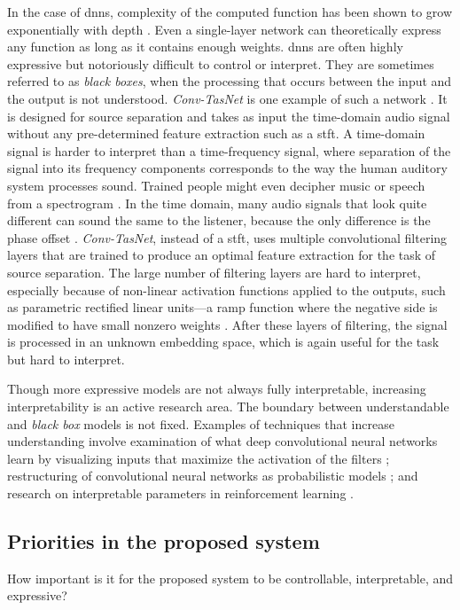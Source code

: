 In the case of \gls{dnn}s, complexity of the computed function has been shown to grow exponentially with depth \cite{raghu2017expressive}. Even a single-layer network can theoretically express any function as long as it contains enough weights. \gls{dnn}s are often highly expressive but notoriously difficult to control or interpret. They are sometimes referred to as \textit{black boxes}, when the processing that occurs between the input and the output is not understood. \textit{Conv-TasNet} is one example of such a network \cite{luo2019conv}. It is designed for source separation and takes as input the time-domain audio signal without any pre-determined feature extraction such as a \gls{stft}. A time-domain signal is harder to interpret than a time-frequency signal, where separation of the signal into its frequency  components corresponds to the way the human auditory system processes sound. Trained people might even decipher music or speech from a spectrogram \cite[][Ch.~3, p.~41]{raphael-i547}. In the time domain, many audio signals that look quite different can sound the same to the listener, because the only difference is the phase offset \cite{engel2020ddsp}. \textit{Conv-TasNet}, instead of a \gls{stft}, uses multiple convolutional filtering layers that are trained to produce an optimal feature extraction for the task of source separation. The large number of filtering layers are hard to interpret, especially because of non-linear activation functions applied to the outputs, such as parametric rectified linear units---a ramp function where the negative side is modified to have small nonzero weights \cite{he2015delving}. After these layers of filtering, the signal is processed in an unknown embedding space, which is again useful for the task but hard to interpret.

Though more expressive models are not always fully interpretable, increasing interpretability is an active research area. The boundary between understandable and \textit{black box} models is not fixed. Examples of techniques that increase understanding involve examination of what deep convolutional neural networks learn by visualizing inputs that maximize the activation of the filters \cite{qin2018convolutional}; restructuring of convolutional neural networks as probabilistic models \cite{patel2016probabilistic}; and research on interpretable parameters in reinforcement learning \cite{verma2018programmatically}. 

\subsection{Priorities in the proposed system}
How important is it for the proposed system to be controllable, interpretable, and expressive?

